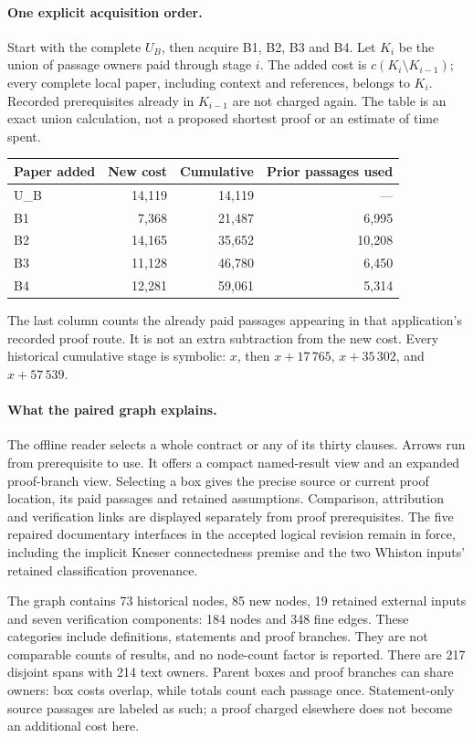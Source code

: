 \documentclass[11pt,a4paper]{article}
\begin{document}
\paragraph{One explicit acquisition order.}
Start with the complete $U_B$, then acquire B1, B2, B3 and B4. Let $K_i$
be the union of passage owners paid through stage $i$. The added cost is
$c(K_i\setminus K_{i-1})$; every complete local paper, including context
and references, belongs to $K_i$. Recorded prerequisites already in
$K_{i-1}$ are not charged again. The table is an exact union calculation,
not a proposed shortest proof or an estimate of time spent.
\begin{center}\begin{tabular}{lrrr}\toprule
Paper added & New cost & Cumulative & Prior passages used\\\midrule
U\_B & 14,119 & 14,119 & ---\\
B1 & 7,368 & 21,487 & 6,995\\
B2 & 14,165 & 35,652 & 10,208\\
B3 & 11,128 & 46,780 & 6,450\\
B4 & 12,281 & 59,061 & 5,314\\
\bottomrule\end{tabular}\end{center}
The last column counts the already paid passages appearing in that
application's recorded proof route. It is not an extra subtraction from the
new cost. Every historical cumulative stage is symbolic: $x$, then
$x+17\,765$, $x+35\,302$, and $x+57\,539$.

\paragraph{What the paired graph explains.}
The offline reader selects a whole contract or any of its thirty clauses.
Arrows run from prerequisite to use. It offers a compact named-result view
and an expanded proof-branch view. Selecting a box gives the precise source
or current proof location, its paid passages and retained assumptions.
Comparison, attribution and verification links are displayed separately
from proof prerequisites. The five repaired documentary interfaces in the
accepted logical revision remain in force, including the implicit Kneser
connectedness premise and the two Whiston inputs' retained classification
provenance.

The graph contains 73 historical nodes, 85 new nodes, 19 retained external
inputs and seven verification components: 184 nodes and 348 fine edges.
These categories include definitions, statements and proof branches. They
are not comparable counts of results, and no node-count factor is reported.
There are 217 disjoint spans with 214 text owners. Parent boxes and proof
branches can share owners: box costs overlap, while totals count each passage
once. Statement-only source passages are labeled as such; a proof charged
elsewhere does not become an additional cost here.
\end{document}
